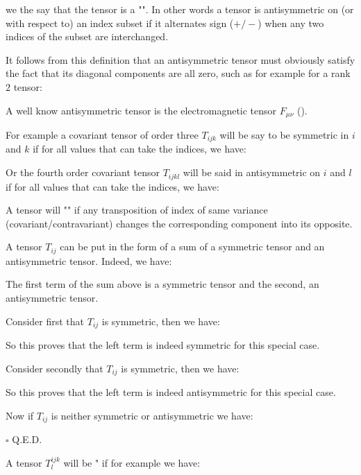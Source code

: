 	we the say that the tensor is a "\label{antisymmetric tensor}".  In other words a tensor is antisymmetric on (or with respect to) an index subset if it alternates sign ($+/-$) when any two indices of the subset are interchanged.
	
	It follows from this definition that an antisymmetric tensor must obviously satisfy the fact that its diagonal components are all zero, such as for example for a rank $2$ tensor:
	
	
	A well know antisymmetric tensor is the electromagnetic tensor $F_{\mu \nu }$ ().
	
	For example a covariant tensor of order three $T_{ijk}$ will be say to be symmetric in $i$ and $k$ if for all values that can take the indices, we have:
	
	Or the fourth order covariant tensor $T_{ijkl}$ will be said in antisymmetric on $i$ and $l$ if for all values that can take the indices, we have:
	 
	
	A tensor will "" if any transposition of index of same variance (covariant/contravariant) changes the corresponding component into its opposite.

	A tensor $T_{ij}$ can be put in the form of a sum of a symmetric tensor and an antisymmetric tensor. Indeed, we have:
	
	The first term of the sum above is a symmetric tensor and the second, an antisymmetric tensor.
	\begin{dem}
	Consider first that $T_{ij}$ is symmetric, then we have:
	
	So this proves that the left term is indeed symmetric for this special case.
	
	Consider secondly that $T_{ij}$ is symmetric, then we have:
	
	So this proves that the left term is indeed antisymmetric for this special case.

	Now if $T_{ij}$ is neither symmetric or antisymmetric we have:
	
	\begin{flushright}
		$\square$  Q.E.D.
	\end{flushright}
	\end{dem}
	A tensor $T_l^{ijk}$ will be " if for example we have:
	
